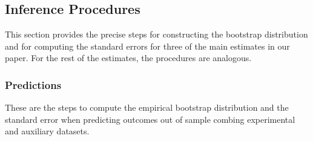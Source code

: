 \subsection{Inference Procedures} \label{appendix:bootstrap}

\noindent This section provides the precise steps for constructing the bootstrap distribution and for computing the standard errors for three of the main estimates in our paper. For the rest of the estimates, the procedures are analogous.

\subsubsection{Predictions}

\noindent These are the steps to compute the empirical bootstrap distribution and the standard error when predicting outcomes out of sample combing experimental and auxiliary datasets.

